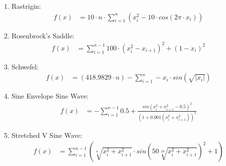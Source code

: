 \documentclass{article}
\begin{document}
\begin{enumerate}
\item Rastrigin:
    \begin{equation} \label{eq:rastrigin} \tag{Rastrigin}
    \begin{aligned}
        f(x) &= 10\cdot n\cdot \sum_{i=1}^{n}\left(x_i^2-10\cdot cos\left(2\pi\cdot x_i\right)\right)
    \end{aligned}
    \end{equation}

\item Rosenbrock's Saddle:
    \begin{equation} \label{eq:rosenbrock} \tag{Rosenbrock's Saddle}
    \begin{aligned}
        f(x) &= \sum_{i=1}^{n-1}100\cdot\left(x_i^2-x_{i+1}\right)^2+\left(1-x_i\right)^2
    \end{aligned}
    \end{equation}

\item Schwefel:
    \begin{equation} \label{eq:schwefel} \tag{Schwefel}
    \begin{aligned}
        f(x) &= \left(418.9829\cdot n\right)-\sum_{i=1}^{n}-x_i\cdot sin\left(\sqrt{\left|x_i\right|}\right)
    \end{aligned}
    \end{equation}

\item Sine Envelope Sine Wave:
    \begin{equation} \label{eq:sesw} \tag{Sine Envelope Sine Wave}
    \begin{aligned}
        f(x) &= -\sum_{i=1}^{n-1}0.5+\frac{sin\left(x_i^2+x_{i+1}^2-0.5\right)^2}{\left(1+0.001\left(x_i^2+x_{i+1}^2\right)\right)^2}
    \end{aligned}
    \end{equation}

\item Stretched V Sine Wave:
    \begin{equation} \label{eq:svsw} \tag{Stretched V Sine Wave}
    \begin{aligned}
        f(x) &= \sum_{i=1}^{n-1}\left(\sqrt[4]{x_i^2+x_{i+1}^2}\cdot sin\left(50\sqrt[10]{x_i^2+x_{i+1}^2}\right)^2+1\right)
    \end{aligned}
    \end{equation}
\end{enumerate}
\end{document}
